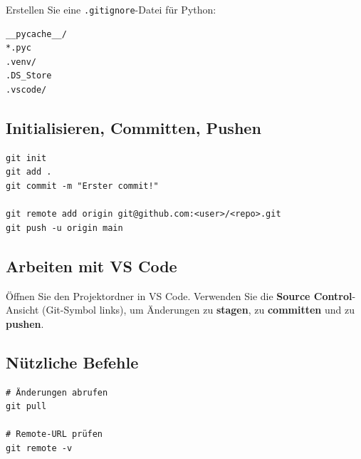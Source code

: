 Erstellen Sie eine \lstinline|.gitignore|-Datei für Python:
\begin{lstlisting}
__pycache__/
*.pyc
.venv/
.DS_Store
.vscode/
\end{lstlisting}

\subsection*{Initialisieren, Committen, Pushen}
\begin{lstlisting}[style=bash]
git init
git add .
git commit -m "Erster commit!"

git remote add origin git@github.com:<user>/<repo>.git
git push -u origin main
\end{lstlisting}

\subsection*{Arbeiten mit VS Code}
Öffnen Sie den Projektordner in VS Code.  
Verwenden Sie die \textbf{Source Control}-Ansicht (Git-Symbol links), um Änderungen zu \textbf{stagen}, zu \textbf{committen} und zu \textbf{pushen}.

\subsection*{Nützliche Befehle}
\begin{lstlisting}[style=bash]
# Änderungen abrufen
git pull

# Remote-URL prüfen
git remote -v
\end{lstlisting}
